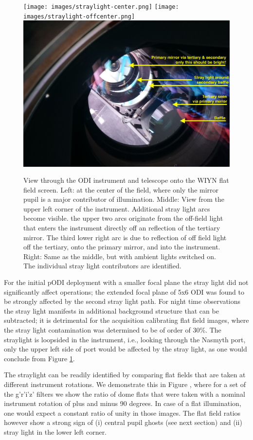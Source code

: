 \documentclass[]{spieman}
\begin{document}
\begin{figure}[]
\centering 
\texttt{[image: images/straylight-center.png]}
\texttt{[image: images/straylight-offcenter.png]}
\includegraphics[height=0.28\textwidth]{images/ODI-Starylight-Annotated-10177.JPG} \\[1ex]

\caption{\label{fig_straylight} View through the ODI instrument and telescope
    onto the WIYN flat field screen. Left: at the center of the field, where only
    the mirror pupil is a major contributor of illumination. Middle: View from the
    upper left corner of the instrument. Additional stray light arcs become visible.
    the upper two arcs originate from the off-field light that enters the instrument
    directly off an reflection of the tertiary mirror. The third lower right arc is
    due to reflection of off field light off the tertiary, onto the primary mirror,
    and  into the instrument. Right: Same as the middle, but with ambient lights 
    switched on. The individual stray light contributors are identified.  }
\end{figure}


For the initial pODI deployment with a smaller focal plane the stray light did
not significantly affect operations; the extended focal plane of 5x6 ODI was
found to be strongly affected by the second stray light path. For night time
observations the stray light manifests in additional background structure that
can be subtracted; it is detrimental for the acquisition calibrating flat field
images, where the stray light contamination was determined to be of order of
30\%. The straylight is loopsided in the instrument, i.e., looking through the
Nasmyth port, only the upper left side of port would be affected by the stray
light, as one would conclude from Figure \ref{fig_straylight}.

The straylight  can be readily identified by comparing flat fields that are
taken at different instrument rotations. We demonstrate this in Figure
\label{fig_flatfieldbaffle}, where for a set of the g'r'i'z' filters we show the
ratio of dome flats that were taken with a nominal instrument rotation of plus
and minus 90 degrees.  In case of a flat illumination, one would expect a
constant ratio of unity in those images. The flat field ratios however show a
strong sign of (i) central pupil ghosts (see next section) and (ii) stray light
in the lower left corner.
\end{document}

